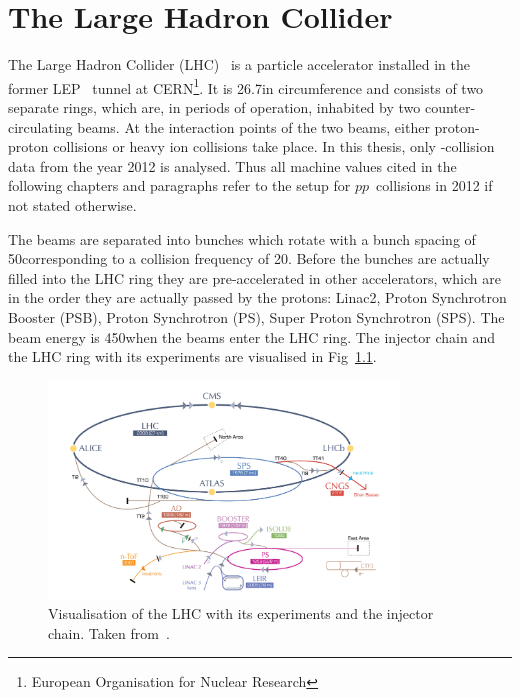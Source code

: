 \chapter{The Large Hadron Collider}
\label{ch:LargeHadronCollider}

The Large Hadron Collider (LHC)~\cite{bib:LHC_machine_2008,bib:LHC_2004} is a particle accelerator installed in the former LEP~\cite{bib:LEP_design_1984} tunnel at CERN\footnote{European Organisation for Nuclear Research}.
It is 26.7\km in circumference and consists of two separate rings, which are, in periods of operation, inhabited by two counter-circulating beams.
At the interaction points of the two beams, either proton-proton collisions or heavy ion collisions take place.
In this thesis, only \pp-collision data from the year 2012 is analysed.
Thus all machine values cited in the following chapters and paragraphs refer to the setup for $pp$~collisions in 2012 if not stated otherwise.

The beams are separated into bunches which rotate with a bunch spacing of 50\ns corresponding to a collision frequency of 20\mhz.
Before the bunches are actually filled into the LHC ring they are pre-accelerated in other accelerators, which are in the order they are actually passed by the protons: Linac2, Proton  Synchrotron Booster (PSB), Proton Synchrotron (PS), Super Proton Synchrotron (SPS).
The beam energy is 450\gev when the beams enter the LHC ring.
The injector chain and the LHC ring with its experiments are visualised in Fig~\ref{fig:LHC}.
\begin{figure}[!b]
  \centering
      \includegraphics[width=0.83\textwidth]{figures/experiment/LHC/LHC_small.png}
  \caption{Visualisation of the LHC with its experiments and the injector chain. Taken from~\cite{bib:CERNBrochure}.}  
  \label{fig:LHC}
\end{figure}

